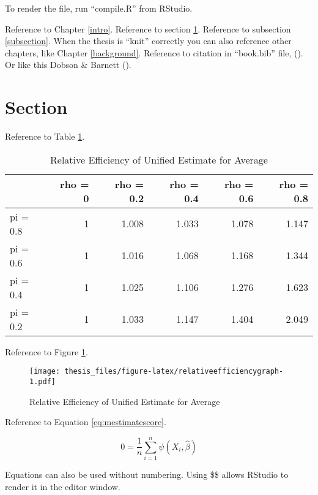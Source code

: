 \documentclass[
  12pt,
  openany, oneside]{book}
\theoremstyle{definition}
\theoremstyle{definition}
\theoremstyle{definition}
\theoremstyle{definition}
\theoremstyle{remark}
\begin{document}
To render the file, run ``compile.R'' from RStudio.

Reference to Chapter \ref{intro}. Reference to section \ref{section}. Reference to subsection \ref{subsection}. When the thesis is ``knit'' correctly you can also reference other chapters, like Chapter \ref{background}. Reference to citation in ``book.bib'' file, (). Or like this Dobson \& Barnett ().

\section{Section}\label{section}

Reference to Table \ref{tab:relativeefficiencytab}.

\begin{table}

\caption{\label{tab:relativeefficiencytab}Relative Efficiency of Unified Estimate for Average}
\centering
\begin{tabular}[t]{l|r|r|r|r|r}
\hline
  & rho = 0 & rho = 0.2 & rho = 0.4 & rho = 0.6 & rho = 0.8\\
\hline
pi = 0.8 & 1 & 1.008 & 1.033 & 1.078 & 1.147\\
\hline
pi = 0.6 & 1 & 1.016 & 1.068 & 1.168 & 1.344\\
\hline
pi = 0.4 & 1 & 1.025 & 1.106 & 1.276 & 1.623\\
\hline
pi = 0.2 & 1 & 1.033 & 1.147 & 1.404 & 2.049\\
\hline
\end{tabular}
\end{table}

Reference to Figure \ref{fig:relativeefficiencygraph}.

\begin{figure}
\centering
\texttt{[image: thesis\_files/figure-latex/relativeefficiencygraph-1.pdf]}
\caption{\label{fig:relativeefficiencygraph}Relative Efficiency of Unified Estimate for Average}
\end{figure}

Reference to Equation \eqref{eq:mestimatescore}.

\begin{equation}
0 = \frac{1}{n}\sum_{i=1}^n \psi(X_i,\hat{\beta})
\label{eq:mestimatescore}
\end{equation}

Equations can also be used without numbering. Using \$\$ allows RStudio to render it in the editor window.
\end{document}
